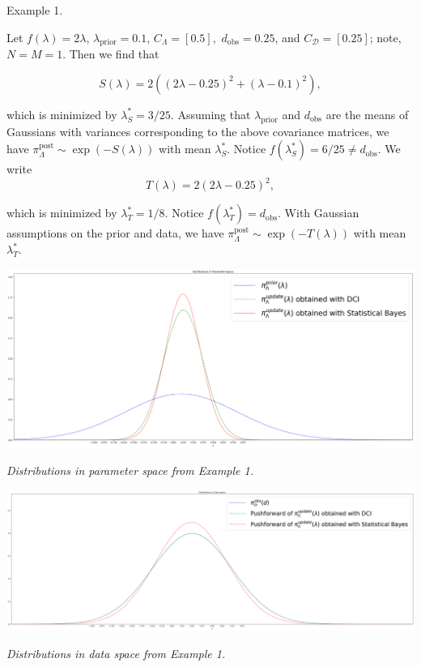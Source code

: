 \documentclass[11pt]{beamer}
\begin{document}
\begin{frame}

\begin{block}{Example 1.}

\noindent Let $f(\lambda)=2\lambda$, $\lambda_\text{prior}=0.1$, $C_\Lambda=[0.5],$ $d_\text{obs}=0.25$, and $C_\mathcal{D}=[0.25]$; note, $N=M=1$. Then we find that 

$$S(\lambda)=2((2\lambda-0.25)^2+(\lambda-0.1)^2),$$ 

\noindent which is minimized by $\lambda^*_S=3/25$. Assuming that $\lambda_\text{prior}$ and $d_\text{obs}$ are the means of Gaussians with variances corresponding to the above covariance matrices, we have $\pi_\Lambda^\text{post} \sim \exp(-S(\lambda))$ with mean $\lambda_S^*$. Notice $f(\lambda^*_S)=6/25\neq d_\text{obs}$. We write 
$$T(\lambda)=2(2\lambda-0.25)^2,$$ 

\noindent which is minimized by $\lambda^*_T=1/8$. Notice $f(\lambda^*_T)=d_\text{obs}$. With Gaussian assumptions on the prior and data, we have $\pi_\Lambda^\text{post} \sim \exp(-T(\lambda))$ with mean $\lambda_T^*$.
\end{block}


\end{frame}

\begin{frame}

\begin{center} 
\includegraphics[scale=0.15]{param}

\textit{Distributions in parameter space from Example 1.}
\end{center}

\end{frame}


\begin{frame}

\begin{center} 
\includegraphics[scale=0.125]{data}

\textit{Distributions in data space from Example 1.}
\end{center}

\end{frame}
\end{document}
